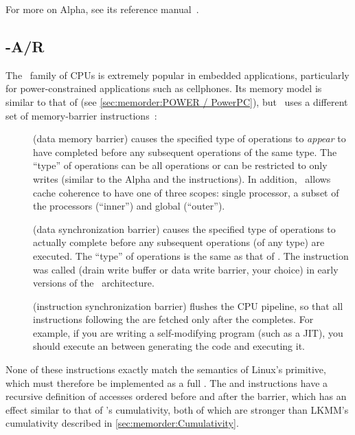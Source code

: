 For more on Alpha, see its reference manual~\cite{ALPHA2002}.

\subsection{-A/R}
\label{sec:memorder:ARMv7-A/R}

The \ARM\ family of CPUs is extremely popular in embedded applications,
particularly for power-constrained applications such as cellphones.
Its memory model is similar to that of \Power{}
(see \cref{sec:memorder:POWER / PowerPC}), but \ARM\ uses a
different set of memory-barrier instructions~\cite{ARMv7A:2010}:

\begin{description}
\item	[] (data memory barrier) causes the specified type of
	operations to \emph{appear} to have completed before any
	subsequent operations of the same type.
	The ``type'' of operations can be all operations or can be
	restricted to only writes (similar to the Alpha 
	and the \Power{}  instructions).
	In addition, \ARM\ allows cache coherence to have one of three
	scopes: single processor, a subset of the processors
	(``inner'') and global (``outer'').
\item	[] (data synchronization barrier) causes the specified
	type of operations to actually complete before any subsequent
	operations (of any type) are executed.
	The ``type'' of operations is the same as that of .
	The  instruction was called  (drain write buffer
	or data write barrier, your choice) in early versions of the
	\ARM\ architecture.
\item	[] (instruction synchronization barrier) flushes the CPU
	pipeline, so that all instructions following the 
	are fetched only after the  completes.
	For example, if you are writing a self-modifying program
	(such as a JIT), you should execute an  between
	generating the code and executing it.
\end{description}

None of these instructions exactly match the semantics of Linux's
 primitive, which must therefore be implemented as a full
.
The  and  instructions have a recursive definition
of accesses ordered before and after the barrier, which has an effect
similar to that of \Power{}'s cumulativity, both of which are
stronger than LKMM's cumulativity described in
\cref{sec:memorder:Cumulativity}.

